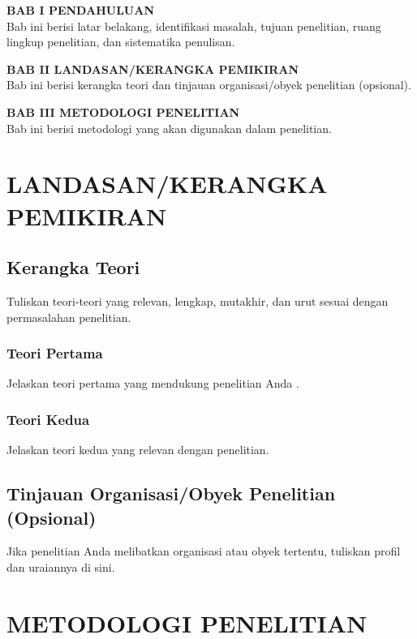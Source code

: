 \documentclass[12pt,a4paper]{article}
\begin{document}
\textbf{BAB I PENDAHULUAN}\\
Bab ini berisi latar belakang, identifikasi masalah, tujuan penelitian, ruang lingkup penelitian, dan sistematika penulisan.

\textbf{BAB II LANDASAN/KERANGKA PEMIKIRAN}\\
Bab ini berisi kerangka teori dan tinjauan organisasi/obyek penelitian (opsional).

\textbf{BAB III METODOLOGI PENELITIAN}\\
Bab ini berisi metodologi yang akan digunakan dalam penelitian.

\newpage

\section{LANDASAN/KERANGKA PEMIKIRAN}

\subsection{Kerangka Teori}
Tuliskan teori-teori yang relevan, lengkap, mutakhir, dan urut sesuai dengan permasalahan penelitian.

\subsubsection{Teori Pertama}
Jelaskan teori pertama yang mendukung penelitian Anda \cite{referensi2024}.

\subsubsection{Teori Kedua}
Jelaskan teori kedua yang relevan dengan penelitian.

\subsection{Tinjauan Organisasi/Obyek Penelitian (Opsional)}
Jika penelitian Anda melibatkan organisasi atau obyek tertentu, tuliskan profil dan uraiannya di sini.

\newpage

\section{METODOLOGI PENELITIAN}
\end{document}
